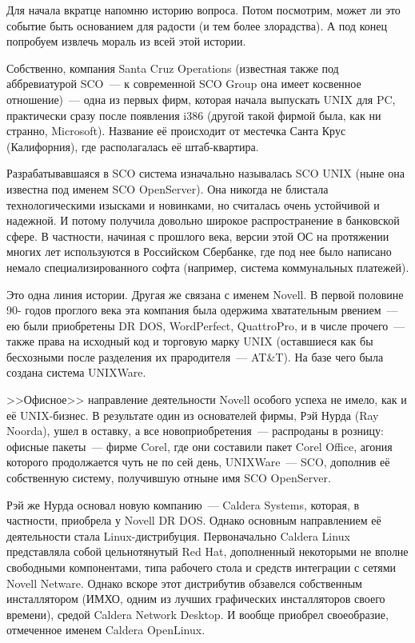 Для начала вкратце напомню историю вопроса. Потом посмотрим, может ли это событие быть основанием для радости (и тем более злорадства). А под конец попробуем извлечь мораль из всей этой истории.

Собственно, компания Santa Cruz Operations (известная также под аббревиатурой SCO~--- к современной SCO Group она имеет косвенное отношение)~--- одна из первых фирм, которая начала выпускать UNIX для PC, практически сразу после появления i386 (другой такой фирмой была, как ни странно, Microsoft). Название её происходит от местечка Санта Крус (Калифорния), где располагалась её штаб-квартира.

Разрабатывавшаяся в SCO система изначально называлась SCO UNIX (ныне она известна под именем SCO OpenServer). Она никогда не блистала технологическими изысками и новинками, но считалась очень устойчивой и надежной. И потому получила довольно широкое распространение в банковской сфере. В частности, начиная с прошлого века, версии этой ОС на протяжении многих лет используются в Российском Сбербанке, где под нее было написано немало специализированного софта (например, система коммунальных платежей).

Это одна линия истории. Другая же связана с именем Novell. В первой половине 90- годов проглого века эта компания была одержима хватательным рвением~--- ею были приобретены DR DOS, WordPerfect, QuattroPro, и в числе прочего~--- также права на исходный код и торговую марку UNIX (оставшиеся как бы бесхозными после разделения их прародителя~--- AT\&T). На базе чего была создана система UNIXWare.

>>Офисное>> направление деятельности Novell особого успеха не имело, как и её UNIX-бизнес. В результате один из основателей фирмы, Рэй Нурда (Ray Noorda), ушел в оставку, а все новоприобретения~--- распроданы в розницу: офисные пакеты~--- фирме Corel, где они составили пакет Corel Office, агония которого продолжается чуть не по сей день, UNIXWare~--- SCO, дополнив её собственную систему, получившую отныне имя SCO OpenServer.

Рэй же Нурда основал новую компанию~--- Caldera Systems, которая, в частности, приобрела у Novell DR DOS. Однако основным направлением её деятельности стала Linux-дистрибуция. Первоначально Caldera Linux представляла собой цельнотянутый Red Hat, дополненный некоторыми не вполне свободными компонентами, типа рабочего стола и средств интеграции с сетями Novell Netware. Однако вскоре этот дистрибутив обзавелся собственным инсталлятором (ИМХО, одним из лучших графических инсталляторов своего времени), средой Caldera Network Desktop. И вообще приобрел своеобразие, отмеченное именем Caldera OpenLinux.

